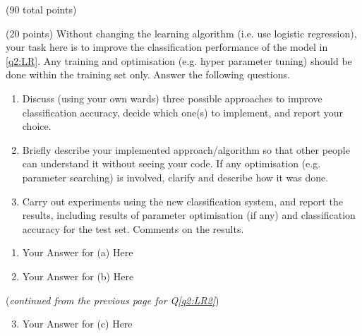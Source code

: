 \documentclass[12pt]{article}
\begin{document}
\begin{question}{(90 total points) \qTwoTitle}
\begin{subquestion}
\end{subquestion}

\begin{subquestion}{(20 points)
    Without changing the learning algorithm (i.e. use logistic regression), your task here is to improve the classification performance of the model in \ref{q2:LR}.
    Any training and optimisation (e.g. hyper parameter tuning) should be done within the training set only.
    Answer the following questions.
  }\label{q2:LR2}
  \begin{enumerate}\NARROWITEM
  \item Discuss (using your own wards) three possible approaches to improve classification accuracy, decide which one(s) to implement, and report your choice.
  \item Briefly describe your implemented approach/algorithm so that other people can understand it without seeing your code. If any optimisation (e.g. parameter searching) is involved, clarify and describe how it was done.
  \item Carry out experiments using the new classification system, and report the results, including results of parameter optimisation (if any) and classification accuracy for the test set. Comments on the results.
  \end{enumerate}
   

  \begin{answerbox}{0.7\textheight}
    \begin{enumerate}
    \item Your Answer for (a) Here
    \item Your Answer for (b) Here
    \end{enumerate}
  \end{answerbox}
  \clearpage
  ({\it continued from the previous page for Q\ref{q2:LR2}})
  \begin{answerbox}{0.95\textheight}
    \begin{enumerate}\setcounter{enumi}{2}
    \item Your Answer for (c) Here
    \end{enumerate}
  \end{answerbox}
  


\end{subquestion}


\end{question}
\end{document}
